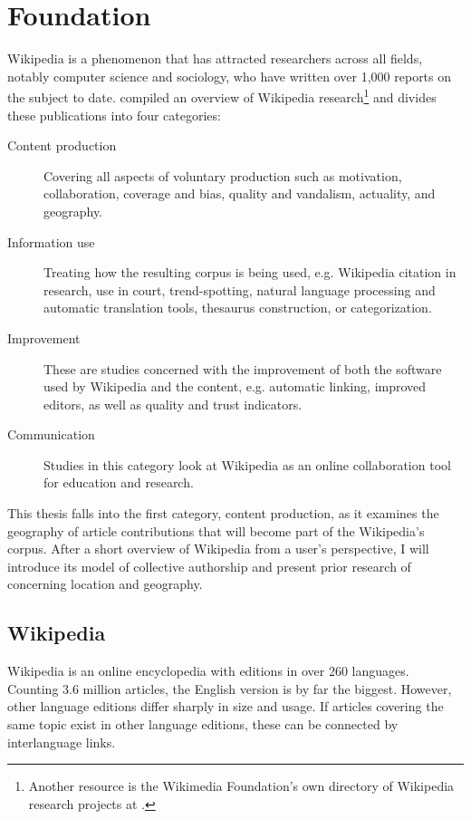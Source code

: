 \chapter{Foundation}\label{ch:foundation}

Wikipedia is a phenomenon that has attracted researchers across all fields, notably computer science and sociology, who have written over 1,000 reports on the subject to date.
\textcite{nielsen2011wikipedia} compiled an overview of Wikipedia research\footnote{Another resource is the Wikimedia Foundation's own directory of Wikipedia research projects at .} and divides these publications into four categories: 
\begin{description}
\item[Content production] Covering all aspects of voluntary production such as motivation, collaboration, coverage and bias, quality and vandalism, actuality, and geography.
\item[Information use] Treating how the resulting corpus is being used, e.g. Wikipedia citation in research, use in court, trend-spotting, natural language processing and automatic translation tools, thesaurus construction, or categorization.
\item[Improvement] These are studies concerned with the improvement of both the software used by Wikipedia and the content, e.g. automatic linking, improved editors, as well as quality and trust indicators. 
\item[Communication] Studies in this category look at Wikipedia as an online collaboration tool for education and research. 
\end{description}

This thesis falls into the first category, content production, as it examines the geography of article contributions that will become part of the Wikipedia's corpus.
After a short overview of Wikipedia from a user's perspective, I will introduce its model of collective authorship and present prior research of concerning location and geography. 

\section{Wikipedia}\label{sec:wikipedia}

Wikipedia is an online encyclopedia with editions in over 260 languages.
Counting 3.6 million articles, the English version is by far the biggest.
However, other language editions differ sharply in size and usage.\cite{wikistats}
If articles covering the same topic exist in other language editions, these can be connected by interlanguage links.

